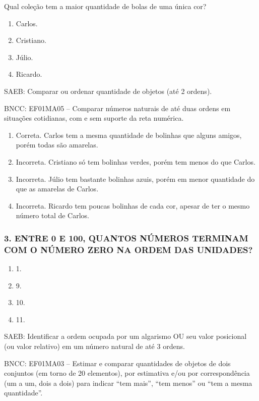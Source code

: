 Qual coleção tem a maior quantidade de bolas de uma única cor?

\begin{enumerate}
\def\labelenumi{\Alph{enumi})}
\item
  Carlos.
\item
  Cristiano.
\item
  Júlio.
\item
  Ricardo.
\end{enumerate}

SAEB: Comparar ou ordenar quantidade de objetos (até 2 ordens).

BNCC: EF01MA05 -- Comparar números naturais de até duas ordens em
situações cotidianas, com e sem suporte da reta numérica.

\begin{enumerate}
\def\labelenumi{\alph{enumi})}
\item
  Correta. Carlos tem a mesma quantidade de bolinhas que alguns amigos,
  porém todas são amarelas.
\item
  Incorreta. Cristiano só tem bolinhas verdes, porém tem menos do
  que Carlos.
\item
  Incorreta. Júlio tem bastante bolinhas azuis, porém em menor quantidade
  do que as amarelas de Carlos.
\item
  Incorreta. Ricardo tem poucas bolinhas de cada cor, apesar de ter o mesmo
  número total de Carlos.
\end{enumerate}

\subsubsection{3. ENTRE 0 E 100, QUANTOS NÚMEROS TERMINAM COM O NÚMERO ZERO NA ORDEM DAS UNIDADES?}\label{section-6}

\begin{enumerate}
\def\labelenumi{\Alph{enumi})}
\item
  1.
\item
  9.
\item
  10.
\item
  11.
\end{enumerate}

SAEB: Identificar a ordem ocupada por um algarismo OU seu valor
posicional (ou valor relativo) em um número natural de até 3 ordens.

BNCC: EF01MA03 -- Estimar e comparar quantidades de objetos de dois
conjuntos (em torno de 20 elementos), por estimativa e/ou por
correspondência (um a um, dois a dois) para indicar ``tem mais'', ``tem
menos'' ou ``tem a mesma quantidade''.

